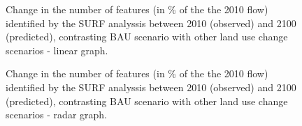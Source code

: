 

\begin{figure}[h!]
 \caption{Change in the number of features (in \% of the the 2010 flow) identified by the SURF analyssis between 2010 (observed) and 2100 (predicted), contrasting BAU scenario with other land use change scenarios - linear graph.}
 \label{fig:surf_linear_1}
\end{figure}


\begin{figure}[h!]
 \caption{Change in the number of features (in \% of the the 2010 flow) identified by the SURF analyssis between 2010 (observed) and 2100 (predicted), contrasting BAU scenario with other land use change scenarios - radar graph.}
 \label{fig:surf_radar_1}
\end{figure}

